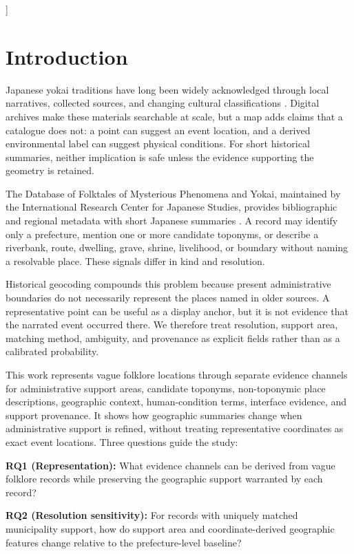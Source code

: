 \documentclass[9pt,twocolumn,a4paper]{extarticle}
\begin{document}
{\vspace{1.5em}
}]

\section{Introduction}

Japanese yokai traditions have long been widely acknowledged through local narratives, collected sources, and changing cultural classifications \citep{foster2024}. Digital archives make these materials searchable at scale, but a map adds claims that a catalogue does not: a point can suggest an event location, and a derived environmental label can suggest physical conditions. For short historical summaries, neither implication is safe unless the evidence supporting the geometry is retained.

The Database of Folktales of Mysterious Phenomena and Yokai, maintained by the International Research Center for Japanese Studies, provides bibliographic and regional metadata with short Japanese summaries \citep{nichibun2025}. A record may identify only a prefecture, mention one or more candidate toponyms, or describe a riverbank, route, dwelling, grave, shrine, livelihood, or boundary without naming a resolvable place. These signals differ in kind and resolution.

Historical geocoding compounds this problem because present administrative boundaries do not necessarily represent the places named in older sources. A representative point can be useful as a display anchor, but it is not evidence that the narrated event occurred there. We therefore treat resolution, support area, matching method, ambiguity, and provenance as explicit fields rather than as a calibrated probability.

This work represents vague folklore locations through separate evidence channels for administrative support areas, candidate toponyms, non-toponymic place descriptions, geographic context, human-condition terms, interface evidence, and support provenance. It shows how geographic summaries change when administrative support is refined, without treating representative coordinates as exact event locations. Three questions guide the study:

\textbf{RQ1 (Representation):} What evidence channels can be derived from vague folklore records while preserving the geographic support warranted by each record?

\textbf{RQ2 (Resolution sensitivity):} For records with uniquely matched municipality support, how do support area and coordinate-derived geographic features change relative to the prefecture-level baseline?
\end{document}
